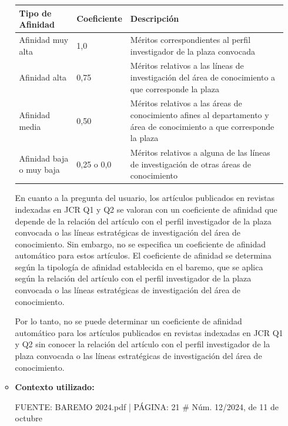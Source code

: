\documentclass{article}
\begin{document}
\begin{itemize}
\begin{itemize}
                \vspace{0.4cm}
                \begin{table}[h!]\centering\renewcommand{\arraystretch}{1.3}
                  \begin{tabular}{|p{}|p{}|p{}|}\hline
                    Tipo de Afinidad         & Coeficiente & Descripción                                                                                                            \\\hline
                    Afinidad muy alta        & 1,0         & Méritos correspondientes al perfil investigador de la plaza convocada                                                  \\\hline
                    Afinidad alta            & 0,75        & Méritos relativos a las líneas de investigación del área de conocimiento a que corresponde la plaza                    \\\hline
                    Afinidad media           & 0,50        & Méritos relativos a las áreas de conocimiento afines al departamento y área de conocimiento a que corresponde la plaza \\\hline
                    Afinidad baja o muy baja & 0,25 o 0,0  & Méritos relativos a alguna de las líneas de investigación de otras áreas de conocimiento                               \\\hline
                  \end{tabular}\end{table}
                \vspace{0.4cm}

                En cuanto a la pregunta del usuario, los artículos publicados en revistas indexadas en JCR Q1 y Q2 se valoran con un coeficiente de afinidad que depende de la relación del artículo con el perfil investigador de la plaza convocada o las líneas estratégicas de investigación del área de conocimiento. Sin embargo, no se especifica un coeficiente de afinidad automático para estos artículos. El coeficiente de afinidad se determina según la tipología de afinidad establecida en el baremo, que se aplica según la relación del artículo con el perfil investigador de la plaza convocada o las líneas estratégicas de investigación del área de conocimiento.

                Por lo tanto, no se puede determinar un coeficiente de afinidad automático para los artículos publicados en revistas indexadas en JCR Q1 y Q2 sin conocer la relación del artículo con el perfil investigador de la plaza convocada o las líneas estratégicas de investigación del área de conocimiento.
          \item \textbf{Contexto utilizado:}
                \begin{scriptsize}
                  FUENTE: BAREMO 2024.pdf | PÁGINA: 21
                  \# Núm. 12/2024, de 11 de octubre


\end{scriptsize}
\end{itemize}
\end{itemize}
\end{document}
